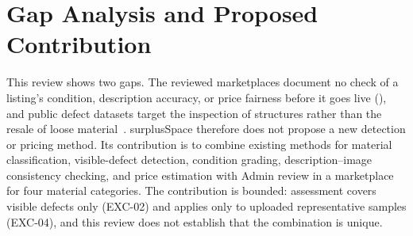 \section{Gap Analysis and Proposed Contribution}
This review shows two gaps. The reviewed marketplaces document no check of a listing's
condition, description accuracy, or price fairness before it goes live
(), and public defect datasets target the inspection of
structures rather than the resale of loose material~\citep{sdnet2018,mbdd2025}. surplusSpace
therefore does not propose a new detection or pricing method. Its contribution is to combine
existing methods for material classification, visible-defect detection, condition grading,
description--image consistency checking, and price estimation with Admin review in a
marketplace for four material categories. The contribution is bounded: assessment covers
visible defects only (EXC-02) and applies only to uploaded representative samples (EXC-04),
and this review does not establish that the combination is unique.

